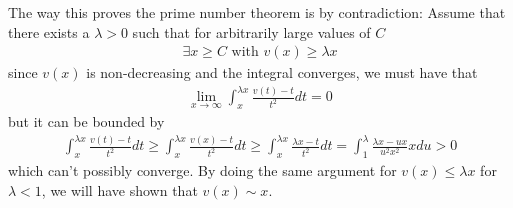 The way this proves the prime number theorem is by contradiction: Assume that there exists a $\lambda > 0$ such that for arbitrarily large values of $C$ 
\begin{align*}
	\exists x \geq C \text{ with } v(x) \geq \lambda x
\end{align*}
since $v(x)$ is non-decreasing and the integral converges, we must have that
\begin{align*}
	\lim_{x \to \infty}	\int_{x}^{\lambda x}\frac{v(t) - t}{t^{2}} dt = 0
\end{align*}
but it can be bounded by
\begin{align*}
	\int_{x}^{\lambda x}\frac{v(t) - t}{t^{2}} dt \geq \int_{x}^{\lambda x} \frac{v(x) - t}{t^{2}} dt \geq 
	\int_{x}^{\lambda x}\frac{\lambda x - t}{t^{2}} dt = \int_{1}^{\lambda} \frac{\lambda x - ux}{u^{2}x^{2}} x du > 0
\end{align*}
which can't possibly converge. By doing the same argument for $v(x) \leq \lambda x$ for $\lambda < 1$, we will have shown that $v(x) \sim x$.





